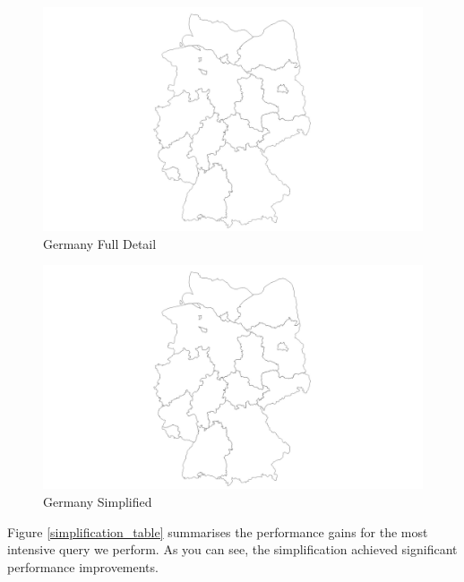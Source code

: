 \documentclass[paper=a4, fontsize=11pt]{article} %
\numberwithin{equation}{section} %
\numberwithin{figure}{section} %
\numberwithin{table}{section} %
\begin{document}
\begin{figure}[htbp]
	\centering
	\includegraphics[trim = 160mm 0mm 160mm 0mm, clip, width=1\textwidth]{pictures/germany_full}
	\caption{Germany Full Detail}
	\label{germany_full}
\end{figure}

\begin{figure}[htbp]
	\centering
	\includegraphics[trim = 160mm 0mm 160mm 0mm, clip, width=1\textwidth]{pictures/germany_simplified}
	\caption{Germany Simplified}
	\label{germany_simple}
\end{figure}



Figure \ref{simplification_table} summarises the performance gains for the most intensive query we perform. As you can see, the simplification achieved significant performance improvements.
\end{document}
